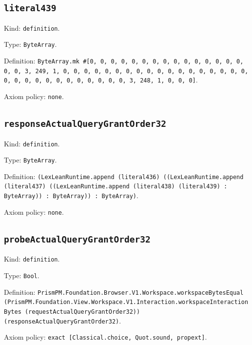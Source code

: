 \documentclass[11pt]{article}
\begin{document}
\subsection*{\texttt{literal439}}
\noindent Kind: \texttt{definition}.\par
\noindent Type: \texttt{ByteArray}.\par
\noindent Definition: \texttt{ByteArray.mk \#[0, 0, 0, 0, 0, 0, 0, 0, 0, 0, 0, 0, 0, 0, 0, 0, 0, 3, 249, 1, 0, 0, 0, 0, 0, 0, 0, 0, 0, 0, 0, 0, 0, 0, 0, 0, 0, 0, 0, 0, 0, 0, 0, 0, 0, 0, 0, 0, 0, 0, 3, 248, 1, 0, 0, 0]}.\par
\noindent Axiom policy: \texttt{none}.\par
\subsection*{\texttt{responseActualQueryGrantOrder32}}
\noindent Kind: \texttt{definition}.\par
\noindent Type: \texttt{ByteArray}.\par
\noindent Definition: \texttt{(LexLeanRuntime.append (literal436) ((LexLeanRuntime.append (literal437) ((LexLeanRuntime.append (literal438) (literal439) : ByteArray)) : ByteArray)) : ByteArray)}.\par
\noindent Axiom policy: \texttt{none}.\par
\subsection*{\texttt{probeActualQueryGrantOrder32}}
\noindent Kind: \texttt{definition}.\par
\noindent Type: \texttt{Bool}.\par
\noindent Definition: \texttt{PrismPM.Foundation.Browser.V1.Workspace.workspaceBytesEqual (PrismPM.Foundation.View.Workspace.V1.Interaction.workspaceInteractionBytes (requestActualQueryGrantOrder32)) (responseActualQueryGrantOrder32)}.\par
\noindent Axiom policy: \texttt{exact [Classical.choice, Quot.sound, propext]}.\par
\end{document}
